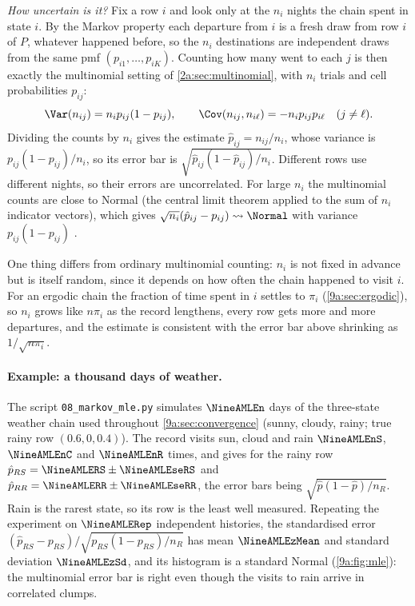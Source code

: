 \emph{How uncertain is it?} Fix a row $i$ and look only at the $n_i$ nights the chain spent
in state $i$. By the Markov property each departure from $i$ is a fresh draw from row $i$ of $P$,
whatever happened before, so the $n_i$ destinations are independent draws from the same pmf
$(p_{i1},\dots,p_{iK})$. Counting how many went to each $j$ is then exactly the multinomial
setting of \cref{2a:sec:multinomial}, with $n_i$ trials and cell probabilities $p_{ij}$:
\begin{equation*}
  \Var(n_{ij})=n_ip_{ij}(1-p_{ij}),\qquad \Cov(n_{ij},n_{i\ell})=-n_ip_{ij}p_{i\ell}\quad(j\ne\ell).
\end{equation*}
Dividing the counts by $n_i$ gives the estimate $\hat p_{ij}=n_{ij}/n_i$, whose variance is
$p_{ij}(1-p_{ij})/n_i$, so its error bar is $\sqrt{\hat p_{ij}(1-\hat p_{ij})/n_i}$. Different
rows use different nights, so their errors are uncorrelated. For large $n_i$ the multinomial
counts are close to Normal (the central limit theorem applied to the sum of $n_i$ indicator
vectors), which gives $\sqrt{n_i}(\hat p_{ij}-p_{ij})\rightsquigarrow\Normal$ with variance
$p_{ij}(1-p_{ij})$ .

One thing differs from ordinary multinomial counting: $n_i$ is not fixed in advance but is
itself random, since it depends on how often the chain happened to visit $i$. For an ergodic
chain the fraction of time spent in $i$ settles to $\pi_i$ (\cref{9a:sec:ergodic}), so $n_i$
grows like $n\pi_i$ as the record lengthens, every row gets more and more departures, and the
estimate is consistent with the error bar above shrinking as $1/\sqrt{n\pi_i}$.

\paragraph{Example: a thousand days of weather.}
The script \texttt{08\_markov\_mle.py} simulates $\NineAMLEn$ days of the three-state weather
chain used throughout \cref{9a:sec:convergence} (sunny, cloudy, rainy; true rainy row
$(0.6,0,0.4)$). The record visits sun, cloud and rain $\NineAMLEnS$, $\NineAMLEnC$ and
$\NineAMLEnR$ times, and gives for the rainy row
$\hat p_{RS}=\NineAMLERS\pm\NineAMLEseRS$ and $\hat p_{RR}=\NineAMLERR\pm\NineAMLEseRR$, the error
bars being $\sqrt{\hat p(1-\hat p)/n_R}$. Rain is the rarest state, so its row is the least
well measured. Repeating the experiment on $\NineAMLERep$ independent histories, the
standardised error $(\hat p_{RS}-p_{RS})/\sqrt{p_{RS}(1-p_{RS})/n_R}$ has mean
$\NineAMLEzMean$ and standard deviation $\NineAMLEzSd$, and its histogram is a standard
Normal (\cref{9a:fig:mle}): the multinomial error bar is right even though the visits to
rain arrive in correlated clumps.

